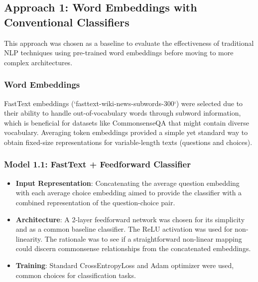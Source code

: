\documentclass[10.5pt]{article}
\begin{document}
\subsection{Approach 1: Word Embeddings with Conventional Classifiers}
This approach was chosen as a baseline to evaluate the effectiveness of traditional NLP techniques using pre-trained word embeddings before moving to more complex architectures.
\subsubsection{Word Embeddings}
FastText embeddings (`fasttext-wiki-news-subwords-300`) were selected due to their ability to handle out-of-vocabulary words through subword information, which is beneficial for datasets like CommonsenseQA that might contain diverse vocabulary. Averaging token embeddings provided a simple yet standard way to obtain fixed-size representations for variable-length texts (questions and choices).

\subsubsection{Model 1.1: FastText + Feedforward Classifier}
\begin{itemize}
    \item \textbf{Input Representation}: Concatenating the average question embedding with each average choice embedding aimed to provide the classifier with a combined representation of the question-choice pair.
    \item \textbf{Architecture}: A 2-layer feedforward network was chosen for its simplicity and as a common baseline classifier. The ReLU activation was used for non-linearity. The rationale was to see if a straightforward non-linear mapping could discern commonsense relationships from the concatenated embeddings.
    \item \textbf{Training}: Standard CrossEntropyLoss and Adam optimizer were used, common choices for classification tasks.
\end{itemize}
\end{document}
